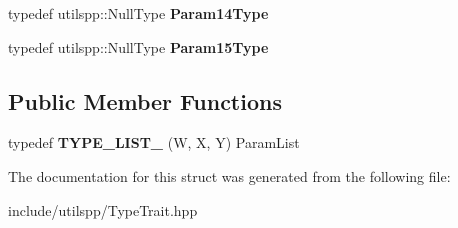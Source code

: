 \begin{DoxyCompactItemize}
\item 
\hypertarget{structutilspp_1_1PointerOnFunction_3_01V_07_5_08_07W_00_01X_00_01Y_08_4_adfab4ce9fd3720d426b8d18142b5ebad}{typedef utilspp\-::\-Null\-Type {\bfseries Param14\-Type}}\label{structutilspp_1_1PointerOnFunction_3_01V_07_5_08_07W_00_01X_00_01Y_08_4_adfab4ce9fd3720d426b8d18142b5ebad}

\item 
\hypertarget{structutilspp_1_1PointerOnFunction_3_01V_07_5_08_07W_00_01X_00_01Y_08_4_abd3906d8a1b2bf8c930cb1e3381feb9f}{typedef utilspp\-::\-Null\-Type {\bfseries Param15\-Type}}\label{structutilspp_1_1PointerOnFunction_3_01V_07_5_08_07W_00_01X_00_01Y_08_4_abd3906d8a1b2bf8c930cb1e3381feb9f}

\end{DoxyCompactItemize}
\subsection*{Public Member Functions}
\begin{DoxyCompactItemize}
\item 
\hypertarget{structutilspp_1_1PointerOnFunction_3_01V_07_5_08_07W_00_01X_00_01Y_08_4_a46df14951b89c20be49ddff983312348}{typedef {\bfseries T\-Y\-P\-E\-\_\-\-L\-I\-S\-T\-\_} (W, X, Y) Param\-List}\label{structutilspp_1_1PointerOnFunction_3_01V_07_5_08_07W_00_01X_00_01Y_08_4_a46df14951b89c20be49ddff983312348}

\end{DoxyCompactItemize}


The documentation for this struct was generated from the following file\-:\begin{DoxyCompactItemize}
\item 
include/utilspp/Type\-Trait.\-hpp\end{DoxyCompactItemize}
